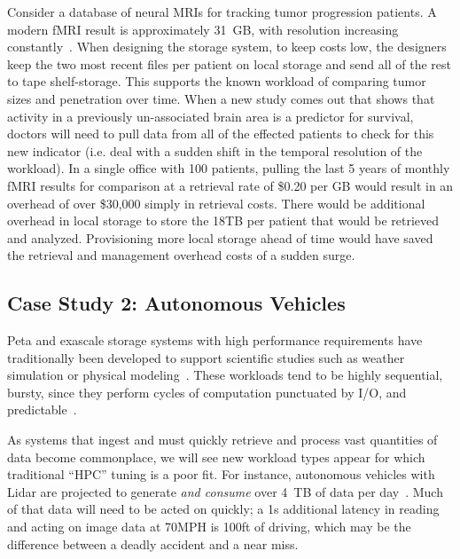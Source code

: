 Consider a
database of neural MRIs for tracking tumor progression patients.  A modern fMRI
result is approximately 31~GB, with resolution increasing
constantly~\cite{hanke2014high}. When designing the storage system,
to keep costs low, the designers keep the two most recent files per patient on local
storage and send all of the rest to tape shelf-storage.  This supports the known
workload of comparing tumor sizes and penetration over time.  When a new study
comes out that shows that activity in a previously un-associated brain area is a
predictor for survival, doctors will need to pull data from all of the effected
patients to check for this new indicator (i.e. deal with a sudden shift in the
temporal resolution of the workload).  In a single office with 100 patients,
pulling the last 5 years of monthly fMRI results for comparison at a retrieval
rate of \$0.20 per GB would result in an overhead of over \$30,000 simply in
retrieval costs.  There would be additional overhead in local storage to store
the 18TB per patient that would be retrieved and analyzed.  Provisioning more
local storage ahead of time would have saved the retrieval and management
overhead costs of a sudden surge.    

\subsection{Case Study 2: Autonomous Vehicles}
Peta and exascale storage systems with high performance requirements have
traditionally been developed to support scientific studies such as weather
simulation or physical modeling~\cite{miyoshi2016big,maeno2014evolution}.  These workloads tend to be highly
sequential, bursty, since they perform cycles of computation punctuated by I/O,
and predictable~\cite{liufast14}.  

As systems that ingest and must quickly retrieve and process vast quantities of
data become commonplace, we will see new workload types appear for which traditional
``HPC'' tuning is a poor fit.  For instance, autonomous vehicles with Lidar
are projected to generate \textit{and consume} over 4~TB of data per
day~\cite{selfdrivingcars}.  Much of that data will need to be acted on quickly; a 1s
additional latency in reading and acting on image data at 70MPH is 100ft of driving, which may be the difference
between a deadly accident and a near miss. 
%


